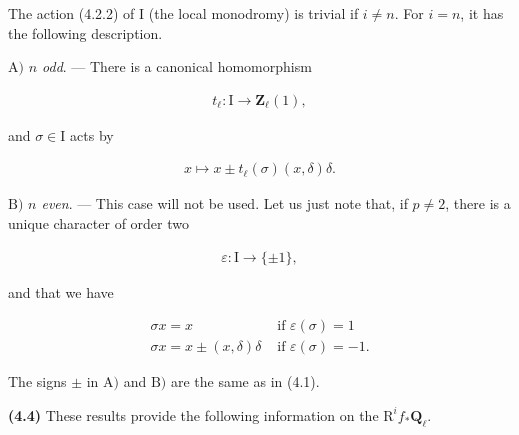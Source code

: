 \documentclass[10pt,leqno]{article}
\begin{document}
\noindent The action (4.2.2) of \(\mathrm{I}\) (the local monodromy) is trivial if \(i\ne n\). For \(i=n\), it has the following description.\par

\noindent \(\mathrm{A})\) \emph{\(n\) odd}. — There is a canonical homomorphism\par

\begin{equation*}\begin{gathered}t_{\ell } : \mathrm{I} \longrightarrow  \mathbf{Z}_{\ell }(1),\end{gathered}\end{equation*}

\noindent and \(\sigma \in \mathrm{I}\) acts by\par

\begin{equation*}\begin{gathered}x \longmapsto  x \pm  t_{\ell }(\sigma )(x,\delta )\delta .\end{gathered}\end{equation*}

\clearpage

\label{physical-18}

\noindent \(\mathrm{B})\) \emph{\(n\) even}. — This case will not be used. Let us just note that, if \(p\ne 2\), there is a unique character of order two\par

\begin{equation*}\begin{gathered}\varepsilon  : \mathrm{I} \longrightarrow  \{\pm 1\},\end{gathered}\end{equation*}

\noindent and that we have\par

\[\begin{array}{ll}\sigma x = x&\text{ if }\varepsilon (\sigma )=1\\\sigma x = x \pm  (x,\delta )\delta &\text{ if }\varepsilon (\sigma )=- 1.\end{array}\]

\noindent The signs \(\pm \) in \(\mathrm{A})\) and \(\mathrm{B})\) are the same as in (4.1).\par

\noindent \textbf{(4.4)} These results provide the following information on the \(\mathrm{R}^{i} f_{*}\mathbf{Q}_{\ell }\).\par
\end{document}
